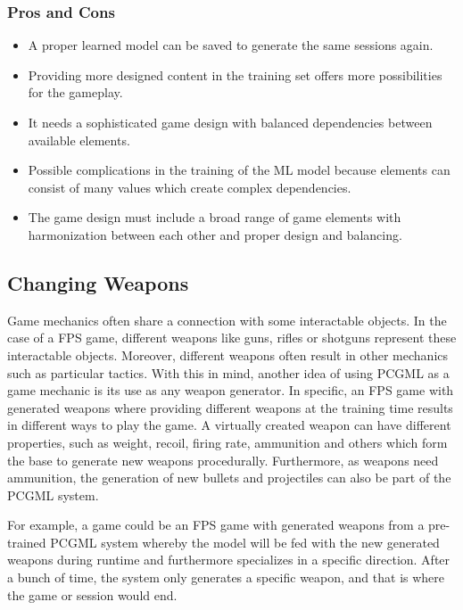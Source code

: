 \documentclass[MGS,Master,english]{twbook}%
\begin{document}
\subsubsection{Pros and Cons}
\begin{itemize}
	\item A proper learned model can be saved to generate the same sessions again.
	\item Providing more designed content in the training set offers more possibilities for the gameplay.
	\item It needs a sophisticated game design with balanced dependencies between available elements.
	\item Possible complications in the training of the ML model because elements can consist of many values which create complex dependencies.
	\item The game design must include a broad range of game elements with harmonization between each other and proper design and balancing.
\end{itemize}

\subsection{Changing Weapons} \label{idea::changingWeapons}
Game mechanics often share a connection with some interactable objects. In the case of a \ac{FPS} game, different weapons like guns, rifles or shotguns represent these interactable objects. Moreover, different weapons often result in other mechanics such as particular tactics. With this in mind, another idea of using PCGML as a game mechanic is its use as any weapon generator. In specific, an FPS game with generated weapons where providing different weapons at the training time results in different ways to play the game. A virtually created weapon can have different properties, such as weight, recoil, firing rate, ammunition and others which form the base to generate new weapons procedurally. Furthermore, as weapons need ammunition, the generation of new bullets and projectiles can also be part of the PCGML system. 

For example, a game could be an FPS game with generated weapons from a pre-trained PCGML system whereby the model will be fed with the new generated weapons during runtime and furthermore specializes in a specific direction. After a bunch of time, the system only generates a specific weapon, and that is where the game or session would end.
\end{document}
